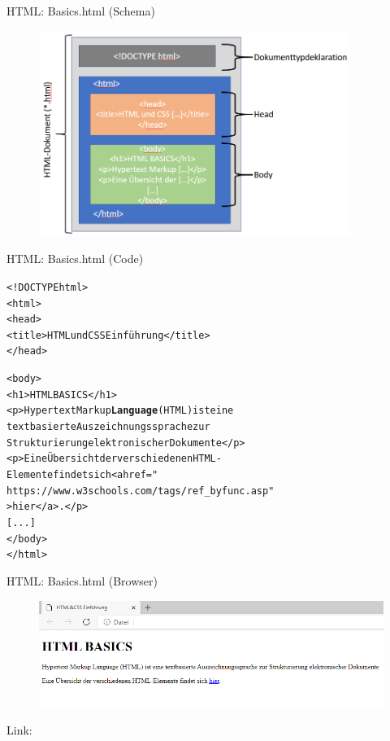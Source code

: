 \documentclass[xcolor=dvipsnames]{beamer}\usepackage[]{graphicx}\usepackage[]{color}
\makeatletter
\newcommand{\hlkwd}[1]{\textcolor[rgb]{0.737,0.353,0.396}{\textbf{#1}}}%
\newenvironment{kframe}{%
 \def\at@end@of@kframe{}%
 \ifinner\ifhmode%
  \def\at@end@of@kframe{\end{minipage}}%
  \begin{minipage}{\columnwidth}%
 \fi\fi%
 \def\FrameCommand##1{\hskip\@totalleftmargin \hskip-\fboxsep
 \colorbox{shadecolor}{##1}\hskip-\fboxsep
     \hskip-\linewidth \hskip-\@totalleftmargin \hskip\columnwidth}%
 \MakeFramed {\advance\hsize-\width
   \@totalleftmargin\z@ \linewidth\hsize
   \@setminipage}}%
 {\par\unskip\endMakeFramed%
 \at@end@of@kframe}
\newenvironment{knitrout}{}{} %
\makeatother
\begin{document}
\begin{frame}{HTML: Basics.html (Schema)}
  \begin{figure}
  	\centering
  	\includegraphics[width=0.9\textwidth]{figure/BasicHtml(Schema).png}
  \end{figure}
\end{frame}


\begin{frame}[fragile]{HTML: Basics.html (Code)}
\begin{knitrout}\small
{}\color{fgcolor}\begin{kframe}
\begin{alltt}
<!DOCTYPE html>
  <html>
    <head>
      <title>HTML und CSS Einführung</title>
    </head>
  
    <body>
      <h1>HTML BASICS</h1>
      <p>Hypertext Markup \hlkwd{Language} (HTML) ist eine
         textbasierte Auszeichnungssprache zur 
         Strukturierung elektronischer Dokumente</p>
      <p>Eine Übersicht der verschiedenen HTML-
         Elemente findet sich <a href="
         https://www.w3schools.com/tags/ref_byfunc.asp"
         >hier</a>.</p>
      [...]
    </body>
  </html>
\end{alltt}
\end{kframe}
\end{knitrout}
\end{frame}


\begin{frame}{HTML: Basics.html (Browser)}
  \begin{figure}
  	\centering
  	\includegraphics[width=1\textwidth]{figure/BasicHtml(Browser).png}
  \end{figure}
  Link: 
\end{frame}
\end{document}
